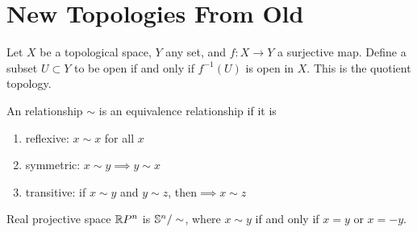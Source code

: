 \documentclass[twocolumn]{article}
\begin{document}
\section{New Topologies From Old}

\begin{defi}
	Let $X$ be a topological space, $Y$ any set, and $f: X \rightarrow Y$ a surjective map.
	Define a subset $U \subset Y$ to be open if and only if $f^{-1}(U)$ is open in $X$. 
	This is the quotient topology.
\end{defi}

\begin{defi}
	An relationship $\sim$ is an equivalence relationship if it is 
	\begin{enumerate}
		\item reflexive: $x \sim x$ for all $x$
		\item symmetric: $x \sim y \implies y \sim x$
		\item transitive: if $x \sim y $ and $y \sim z$, then$ \implies x \sim z$
	\end{enumerate}
\end{defi}

\begin{example}
	Real projective space $\R P^n$ is $\S^n \slash \sim$, where $x \sim y $ if and only if $ x = y$ or $x = -y$.
\end{example}
\end{document}
